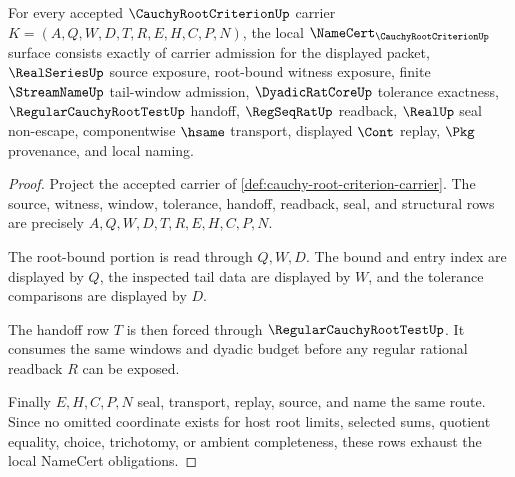 \begin{theorem}
\label{thm:cauchy-root-criterion-namecert-obligations}
For every accepted $\CauchyRootCriterionUp$ carrier $K=(A,Q,W,D,T,R,E,H,C,P,N)$, the local $\NameCert_{\CauchyRootCriterionUp}$ surface consists exactly of carrier admission for the displayed packet, $\RealSeriesUp$ source exposure, root-bound witness exposure, finite $\StreamNameUp$ tail-window admission, $\DyadicRatCoreUp$ tolerance exactness, $\RegularCauchyRootTestUp$ handoff, $\RegSeqRatUp$ readback, $\RealUp$ seal non-escape, componentwise $\hsame$ transport, displayed $\Cont$ replay, $\Pkg$ provenance, and local naming.
\end{theorem}
\begin{proof}
Project the accepted carrier of \autoref{def:cauchy-root-criterion-carrier}. The source, witness, window, tolerance, handoff, readback, seal, and structural rows are precisely $A,Q,W,D,T,R,E,H,C,P,N$.

The root-bound portion is read through $Q,W,D$. The bound and entry index are displayed by $Q$, the inspected tail data are displayed by $W$, and the tolerance comparisons are displayed by $D$.

The handoff row $T$ is then forced through $\RegularCauchyRootTestUp$. It consumes the same windows and dyadic budget before any regular rational readback $R$ can be exposed.

Finally $E,H,C,P,N$ seal, transport, replay, source, and name the same route. Since no omitted coordinate exists for host root limits, selected sums, quotient equality, choice, trichotomy, or ambient completeness, these rows exhaust the local NameCert obligations.
\end{proof}


